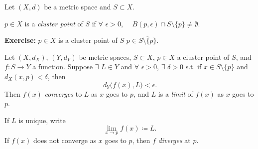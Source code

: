 \documentclass[10pt,aspectratio=169]{beamer}
\begin{document}
\begin{frame}

\begin{definition}
Let $(X,d)$ be a metric space and
$S \subset X$.

\pause
$p \in X$ is 
a \emph{cluster point} of $S$
if $\forall$ $\epsilon > 0$, ~~$B(p,\epsilon) \cap S
\setminus \{ p \} \not= \emptyset$.
\end{definition}

\pause
\textbf{Exercise:}
$p \in X$ is a cluster point of $S$  \wiffif $p \in \overline{S \setminus \{ p \}}$.

\pause
\medskip

\begin{definition}
Let $(X,d_X)$, $(Y,d_Y)$ be metric spaces, $S \subset X$, $p \in X$ a cluster point of $S$,
and $f \colon S \to Y$ a function.
\pause
Suppose $\exists$ $L \in Y$ and $\forall$ $\epsilon > 0$,
$\exists$ $\delta > 0$ s.t. if $x \in S \setminus \{ p \}$
and $d_X(x,p) < \delta$, then
\begin{equation*}
d_Y\bigl(f(x),L\bigr) < \epsilon .
\end{equation*}
\pause
Then $f(x)$
\emph{converges} to $L$ as $x$ goes to $p$,
\pause
and $L$ is a \emph{limit} of $f(x)$ as $x$ goes to $p$.

\pause
If $L$ is unique, write
\begin{equation*}
\lim_{x \to p} f(x) \coloneqq L .
\end{equation*}
\pause
If $f(x)$ does not converge as $x$ goes to $p$, then $f$
\emph{diverges} at $p$.
\end{definition}

\end{frame}
\end{document}

